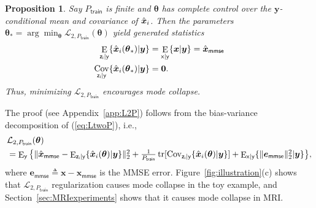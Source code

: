 \documentclass{article}
\theoremstyle{plain}
\newtheorem{proposition}[theorem]{Proposition}
\theoremstyle{definition}
\theoremstyle{remark}
\newcommand{\defn}{\triangleq}
\newcommand{\hvec}[1]{\ensuremath{\Hat{\boldsymbol{#1}}}}
\renewcommand{\vec}[1]{\ensuremath{\boldsymbol{#1}}}
\newcommand{\mc}[1]{\ensuremath{\mathcal{#1}}}
\DeclareMathOperator{\E}{E}
\DeclareMathOperator{\Cov}{Cov}
\DeclareMathOperator{\tr}{tr}
\renewcommand{\eqref}[1]{(\ref{eq:#1})}
\newcommand{\Figref}[1]{Figure~\ref{fig:#1}}
\newcommand{\secref}[1]{Section~\ref{sec:#1}}
\newcommand{\appref}[1]{Appendix~\ref{app:#1}}
\newcommand{\mmse}{_{\mathsf{mmse}}}
\newcommand{\Ey}{\E_{\mathsf{y}}}
\newcommand{\Exgy}{\E_{\mathsf{x}|\mathsf{y}}}
\newcommand{\Ezigy}{\E_{\mathsf{z_i}|\mathsf{y}}}
\newcommand{\Covzigy}{\Cov_{\mathsf{z_i}|\mathsf{y}}}
\newcommand{\train}{_{\mathsf{train}}}
\newcommand{\LtwoPt}{\mc{L}_{2,P\train}}
\begin{document}
\begin{proposition} \label{prop:L2P}
Say $P\train$ is finite and $\vec{\theta}$ has complete control over the $\vec{y}$-conditional mean and covariance of $\hvec{x}_i$.
Then the parameters
$\vec{\theta}_* = \arg\min_{\vec{\theta}} \LtwoPt(\vec{\theta})$ 
yield generated statistics
\begin{subequations}
\begin{align}
\Ezigy\{\hvec{x}_i(\vec{\theta}_*)|\vec{y}\} &= \Exgy\{\vec{x}|\vec{y}\} = \hvec{x}\mmse \\
\Covzigy\{\hvec{x}_i(\vec{\theta}_*)|\vec{y}\} &= \vec{0} .
\end{align}
\end{subequations}
Thus, minimizing $\LtwoPt$ encourages mode collapse.
\end{proposition}

The proof (see \appref{L2P}) follows from the bias-variance decomposition of \eqref{LtwoP}, i.e.,
\begin{align}
&\lefteqn{\LtwoPt(\vec{\theta})}\nonumber\\
&= \textstyle \Ey\big\{ 
    \|\hvec{x}\mmse-\Ezigy\{\hvec{x}_i(\vec{\theta})|\vec{y}\}\|_2^2 
    + \tfrac{1}{P\train} 
      \tr [ \Covzigy\{\hvec{x}_i(\vec{\theta}) | \vec{y}\} ]
    + \Exgy\{\|\vec{e}\mmse\|_2^2 | \vec{y}\} 
    \big\}
\label{eq:LtwoPerrt} ,
\end{align}
where $\vec{e}\mmse\defn \vec{x}-\vec{x}\mmse$ is the MMSE error.
\Figref{illustration}(c) shows that $\LtwoPt$ regularization causes mode collapse in the toy example, and \secref{MRIexperiments} shows that it causes mode collapse in MRI. 

\end{document}
